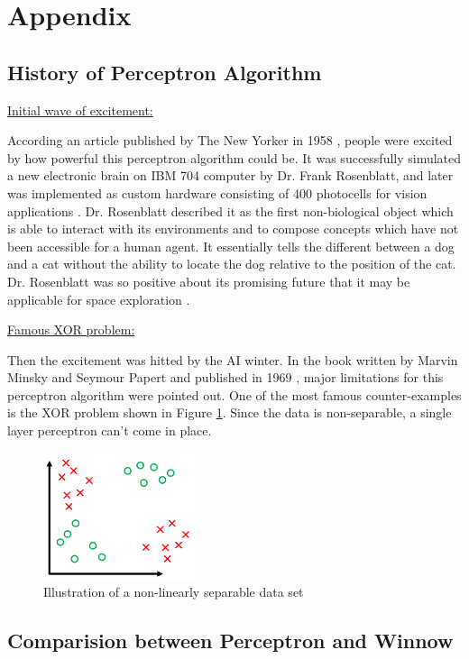 \documentclass[11pt]{article}
\begin{document}
\section{Appendix}
\subsection{ History of Perceptron Algorithm}
\underline{Initial wave of excitement:}

According an article published by The New Yorker in 1958 \cite{NWY}, people were excited by how powerful this perceptron algorithm could be. It was successfully simulated a new electronic brain on IBM 704 computer by Dr. Frank Rosenblatt, and later was implemented as custom hardware consisting of 400 photocells for vision applications \cite{IBM}. Dr. Rosenblatt described it as the first non-biological object which is able to interact with its environments and to compose concepts which have not been accessible for a human agent. It essentially tells the different between a dog and a cat without the ability to locate the dog relative to the position of the cat.  Dr. Rosenblatt was so positive about its promising future that it may be applicable for space exploration \cite{rosenblatt_1958}. 

\underline{Famous XOR problem:}

Then the excitement was hitted by the AI winter. In the book written by Marvin Minsky and Seymour Papert and published in 1969 \cite{minsky69perceptrons}, major limitations for this perceptron algorithm were pointed out. One of the most famous counter-examples is the XOR problem shown in Figure \ref{fig:xor}. Since the data is non-separable, a single layer perceptron can't come in place. 


\begin{figure}[h]
\centering
\includegraphics[width=0.4\textwidth]{perceptron_xor.png}
\caption{Illustration of a non-linearly separable data set}
\label{fig:xor}
\end{figure}


\subsection{Comparision between Perceptron and Winnow}
\end{document}
